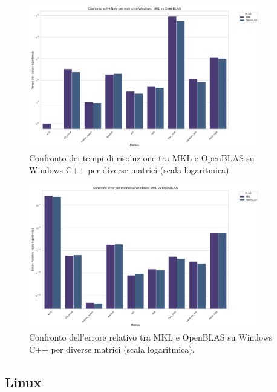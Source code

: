 \begin{figure}[H]
    \centering
    \includegraphics[width=0.9\textwidth]{images/C++/Windows/solveTime_comparison}
    \caption{Confronto dei tempi di risoluzione tra MKL e OpenBLAS su Windows C++ per diverse matrici (scala logaritmica).}
    \label{fig:windows-solve-comparison}
\end{figure}

\begin{figure}[H]
    \centering
    \includegraphics[width=0.9\textwidth]{images/C++/Windows/error_comparison}
    \caption{Confronto dell'errore relativo tra MKL e OpenBLAS su Windows C++ per diverse matrici (scala logaritmica).}
    \label{fig:windows-error-comparison}
\end{figure}

\subsection{Linux}

